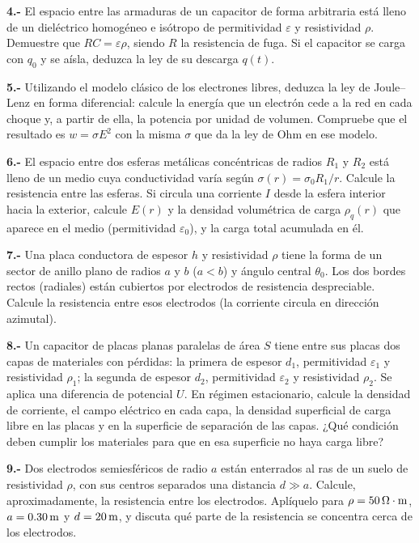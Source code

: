 \documentclass[11pt]{article}
\newcommand{\grupo}[1]{\par\medskip{\color{azul}\bfseries Grupo #1}\par\smallskip}
\newcommand{\p}[1]{\par\smallskip\textbf{#1.-} }
\begin{document}
\p{4} El espacio entre las armaduras de un capacitor de forma arbitraria está lleno de un dieléctrico homogéneo e isótropo de permitividad $\varepsilon$ y resistividad $\rho$. Demuestre que $RC=\varepsilon\rho$, siendo $R$ la resistencia de fuga. Si el capacitor se carga con $q_0$ y se aísla, deduzca la ley de su descarga $q(t)$.

\p{5} Utilizando el modelo clásico de los electrones libres, deduzca la ley de Joule--Lenz en forma diferencial: calcule la energía que un electrón cede a la red en cada choque y, a partir de ella, la potencia por unidad de volumen. Compruebe que el resultado es $w=\sigma E^2$ con la misma $\sigma$ que da la ley de Ohm en ese modelo.

\grupo{II}
\p{6} El espacio entre dos esferas metálicas concéntricas de radios $R_1$ y $R_2$ está lleno de un medio cuya conductividad varía según $\sigma(r)=\sigma_0R_1/r$. Calcule la resistencia entre las esferas. Si circula una corriente $I$ desde la esfera interior hacia la exterior, calcule $E(r)$ y la densidad volumétrica de carga $\rho_q(r)$ que aparece en el medio (permitividad $\varepsilon_0$), y la carga total acumulada en él.

\p{7} Una placa conductora de espesor $h$ y resistividad $\rho$ tiene la forma de un sector de anillo plano de radios $a$ y $b$ ($a<b$) y ángulo central $\theta_0$. Los dos bordes rectos (radiales) están cubiertos por electrodos de resistencia despreciable. Calcule la resistencia entre esos electrodos (la corriente circula en dirección azimutal).

\p{8} Un capacitor de placas planas paralelas de área $S$ tiene entre sus placas dos capas de materiales con pérdidas: la primera de espesor $d_1$, permitividad $\varepsilon_1$ y resistividad $\rho_1$; la segunda de espesor $d_2$, permitividad $\varepsilon_2$ y resistividad $\rho_2$. Se aplica una diferencia de potencial $U$. En régimen estacionario, calcule la densidad de corriente, el campo eléctrico en cada capa, la densidad superficial de carga libre en las placas y en la superficie de separación de las capas. ¿Qué condición deben cumplir los materiales para que en esa superficie no haya carga libre?

\p{9} Dos electrodos semiesféricos de radio $a$ están enterrados al ras de un suelo de resistividad $\rho$, con sus centros separados una distancia $d\gg a$. Calcule, aproximadamente, la resistencia entre los electrodos. Aplíquelo para $\rho=50\ohm\cdot\mathrm{m}$, $a=0.30\uu{m}$ y $d=20\uu{m}$, y discuta qué parte de la resistencia se concentra cerca de los electrodos.
\end{document}
